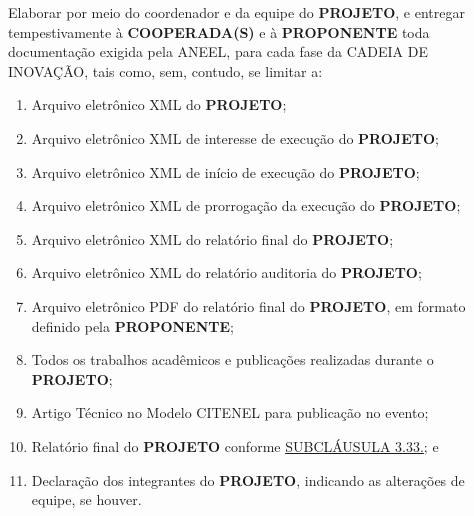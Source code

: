 \xx Elaborar por meio do coordenador e da equipe do \textbf{PROJETO}, e entregar tempestivamente à \textbf{COOPERADA(S)} e à \textbf{PROPONENTE} toda documentação exigida pela ANEEL, para cada fase da CADEIA DE INOVAÇÃO, tais como, sem, contudo, se limitar a:
\begin{enumerate}[label=\alph*), leftmargin=2cm]
    \item Arquivo eletrônico XML do \textbf{PROJETO};
    \item Arquivo eletrônico XML de interesse de execução do \textbf{PROJETO};
    \item Arquivo eletrônico XML de início de execução do \textbf{PROJETO};
    \item Arquivo eletrônico XML de prorrogação da execução do \textbf{PROJETO};
    \item Arquivo eletrônico XML do relatório final do \textbf{PROJETO};
    \item Arquivo eletrônico XML do relatório auditoria do \textbf{PROJETO};
    \item Arquivo eletrônico PDF do relatório final do \textbf{PROJETO}, em formato definido pela \textbf{PROPONENTE};
    \item Todos os trabalhos acadêmicos e publicações realizadas durante o \textbf{PROJETO};
    \item Artigo Técnico no Modelo CITENEL para publicação no evento;
    \item Relatório final do \textbf{PROJETO} conforme \hyperlink{3.33}{SUBCLÁUSULA 3.33.}; e
    \item Declaração dos integrantes do \textbf{PROJETO}, indicando as alterações de equipe, se houver.
\end{enumerate}

